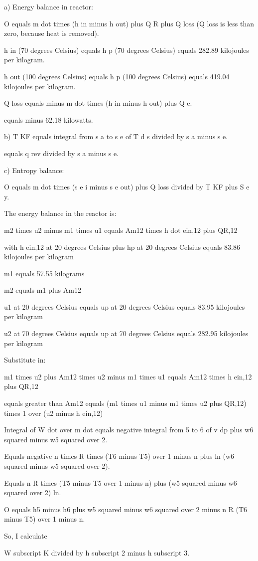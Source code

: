 a) Energy balance in reactor:

O equals m dot times (h in minus h out) plus Q R plus Q loss (Q loss is less than zero, because heat is removed).

h in (70 degrees Celsius) equals h p (70 degrees Celsius) equals 282.89 kilojoules per kilogram.

h out (100 degrees Celsius) equals h p (100 degrees Celsius) equals 419.04 kilojoules per kilogram.

Q loss equals minus m dot times (h in minus h out) plus Q e.

equals minus 62.18 kilowatts.

b) T KF equals integral from s a to s e of T d s divided by s a minus s e.

equals q rev divided by s a minus s e.

c) Entropy balance:

O equals m dot times (s e i minus s e out) plus Q loss divided by T KF plus S e y.

The energy balance in the reactor is:

m2 times u2 minus m1 times u1 equals Am12 times h dot ein,12 plus QR,12

with h ein,12 at 20 degrees Celsius plus hp at 20 degrees Celsius equals 83.86 kilojoules per kilogram

m1 equals 57.55 kilograms

m2 equals m1 plus Am12

u1 at 20 degrees Celsius equals up at 20 degrees Celsius equals 83.95 kilojoules per kilogram

u2 at 70 degrees Celsius equals up at 70 degrees Celsius equals 282.95 kilojoules per kilogram

Substitute in:

m1 times u2 plus Am12 times u2 minus m1 times u1 equals Am12 times h ein,12 plus QR,12

equals greater than Am12 equals (m1 times u1 minus m1 times u2 plus QR,12) times 1 over (u2 minus h ein,12)

Integral of W dot over m dot equals negative integral from 5 to 6 of v dp plus w6 squared minus w5 squared over 2.

Equals negative n times R times (T6 minus T5) over 1 minus n plus ln (w6 squared minus w5 squared over 2).

Equals n R times (T5 minus T5 over 1 minus n) plus (w5 squared minus w6 squared over 2) ln.

O equals h5 minus h6 plus w5 squared minus w6 squared over 2 minus n R (T6 minus T5) over 1 minus n.

So, I calculate 

W subscript K divided by h subscript 2 minus h subscript 3.